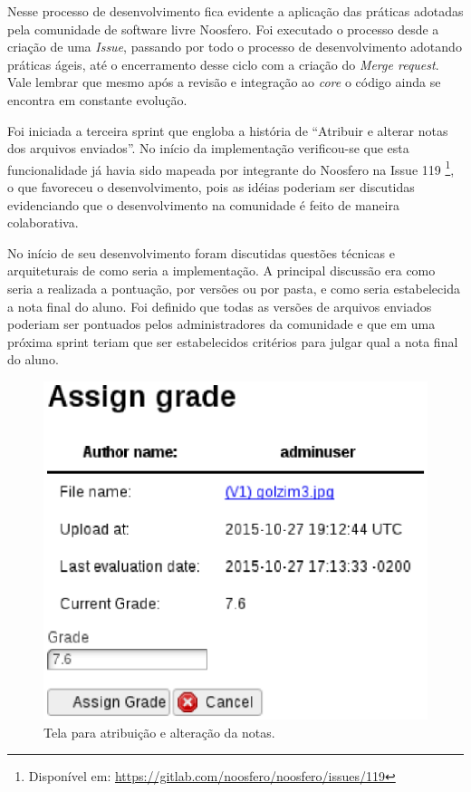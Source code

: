 Nesse processo de desenvolvimento fica evidente a aplicação das práticas adotadas pela comunidade de software livre Noosfero. Foi executado o processo desde a criação de uma \textit{Issue}, passando por todo o processo de desenvolvimento adotando práticas ágeis, até o encerramento desse ciclo com a criação do \textit{Merge request}. Vale lembrar que mesmo após a revisão e integração ao \textit{core} o código ainda se encontra em constante evolução.

Foi iniciada a terceira sprint que engloba a história de ``Atribuir e alterar notas dos arquivos enviados''. No início da implementação verificou-se que esta funcionalidade já havia sido mapeada por integrante do Noosfero na Issue 119 \footnote{Disponível em: \url{https://gitlab.com/noosfero/noosfero/issues/119}}, o que favoreceu o desenvolvimento, pois as idéias poderiam ser discutidas evidenciando que o desenvolvimento na comunidade é feito de maneira colaborativa.

No início de seu desenvolvimento foram discutidas questões técnicas e arquiteturais de como seria a implementação. A principal discussão era como seria a realizada a pontuação, por versões ou por pasta, e como seria estabelecida a nota final do aluno. Foi definido que todas as versões de arquivos enviados poderiam ser pontuados pelos administradores da comunidade e que em uma próxima sprint teriam que ser estabelecidos critérios para julgar qual a nota final do aluno.

\begin{figure}[h]
    \centering
    \includegraphics[keepaspectratio=true,scale=0.6]
      {figuras/assign-grade.eps}
    \caption{Tela para atribuição e alteração da notas.}
    \label{fig:assign-grade}
\end{figure}

